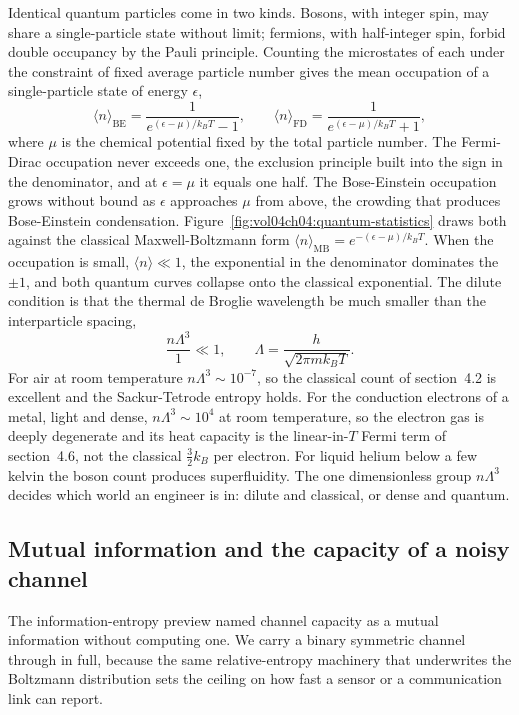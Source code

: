 Identical quantum particles come in two kinds. Bosons, with integer spin, may
share a single-particle state without limit; fermions, with half-integer spin,
forbid double occupancy by the Pauli principle. Counting the microstates of
each under the constraint of fixed average particle number gives the mean
occupation of a single-particle state of energy $\epsilon$,
\[
\langle n\rangle_{\text{BE}} = \frac{1}{e^{(\epsilon-\mu)/k_B T} - 1},
\qquad
\langle n\rangle_{\text{FD}} = \frac{1}{e^{(\epsilon-\mu)/k_B T} + 1},
\]
where $\mu$ is the chemical potential fixed by the total particle number. The
Fermi-Dirac occupation never exceeds one, the exclusion principle built into
the sign in the denominator, and at $\epsilon = \mu$ it equals one half. The
Bose-Einstein occupation grows without bound as $\epsilon$ approaches $\mu$ from
above, the crowding that produces Bose-Einstein condensation.
Figure~\ref{fig:vol04ch04:quantum-statistics} draws both against the classical
Maxwell-Boltzmann form $\langle n\rangle_{\text{MB}} = e^{-(\epsilon-\mu)/k_B T}$.
When the occupation is small, $\langle n\rangle \ll 1$, the exponential in the
denominator dominates the $\pm 1$, and both quantum curves collapse onto the
classical exponential. The dilute condition is that the thermal de Broglie
wavelength be much smaller than the interparticle spacing,
\[
\frac{n\Lambda^3}{1} \ll 1,
\qquad \Lambda = \frac{h}{\sqrt{2\pi m k_B T}}.
\]
For air at room temperature $n\Lambda^3 \sim 10^{-7}$, so the classical count
of section~4.2 is excellent and the Sackur-Tetrode entropy holds. For the
conduction electrons of a metal, light and dense, $n\Lambda^3 \sim 10^{4}$ at
room temperature, so the electron gas is deeply degenerate and its heat capacity
is the linear-in-$T$ Fermi term of section~4.6, not the classical
$\tfrac32 k_B$ per electron. For liquid helium below a few kelvin the boson
count produces superfluidity. The one dimensionless group $n\Lambda^3$ decides
which world an engineer is in: dilute and classical, or dense and quantum.



\subsection{Mutual information and the capacity of a noisy channel}

The information-entropy preview named channel capacity as a mutual information
without computing one. We carry a binary symmetric channel through in full,
because the same relative-entropy machinery that underwrites the Boltzmann
distribution sets the ceiling on how fast a sensor or a communication link can
report.

